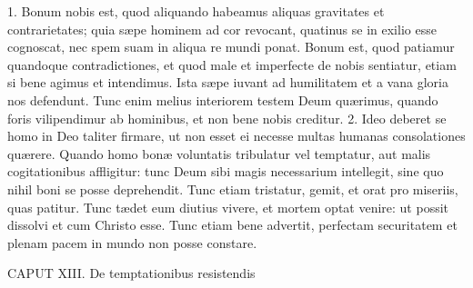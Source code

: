 \documentclass[twoside]{article}
\begin{document}
1. Bonum nobis est, quod aliquando habeamus aliquas gravitates et contrarietates; quia sæpe hominem ad cor revocant, quatinus se in exilio esse cognoscat, nec spem suam in aliqua re mundi ponat. Bonum est, quod patiamur quandoque contradictiones, et quod male et imperfecte de nobis sentiatur, etiam si bene agimus et intendimus. Ista sæpe iuvant ad humilitatem et a vana gloria nos defendunt. Tunc enim melius interiorem testem Deum quærimus, quando foris vilipendimur ab hominibus, et non bene nobis creditur.
2. Ideo deberet se homo in Deo taliter firmare, ut non esset ei necesse multas humanas consolationes quærere. Quando homo bonæ voluntatis tribulatur vel temptatur, aut malis cogitationibus affligitur: tunc Deum sibi magis necessarium intellegit, sine quo nihil boni se posse deprehendit. Tunc etiam tristatur, gemit, et orat pro miseriis, quas patitur. Tunc tædet eum diutius vivere, et mortem optat venire: ut possit dissolvi et cum Christo esse. Tunc etiam bene advertit, perfectam securitatem et plenam pacem in mundo non posse constare.


CAPUT XIII.
De temptationibus resistendis
\end{document}
